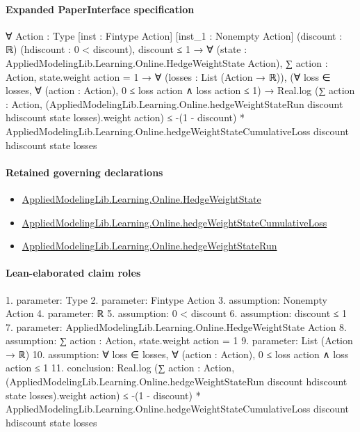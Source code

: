 \documentclass[10pt]{article}
\begin{document}
\paragraph{Expanded PaperInterface specification}
\begin{ReviewVerbatim}
∀ {Action : Type} [inst : Fintype Action] [inst_1 : Nonempty Action] (discount : ℝ) (hdiscount : 0 < discount),
  discount ≤ 1 →
    ∀ (state : AppliedModelingLib.Learning.Online.HedgeWeightState Action),
      ∑ action : Action, state.weight action = 1 →
        ∀ (losses : List (Action → ℝ)),
          (∀ loss ∈ losses, ∀ (action : Action), 0 ≤ loss action ∧ loss action ≤ 1) →
            Real.log
                (∑ action : Action,
                  (AppliedModelingLib.Learning.Online.hedgeWeightStateRun discount hdiscount state losses).weight
                    action) ≤
              -(1 - discount) *
                AppliedModelingLib.Learning.Online.hedgeWeightStateCumulativeLoss discount hdiscount state losses
\end{ReviewVerbatim}

\paragraph{Retained governing declarations}
\begin{itemize}\raggedright
\item \hyperlink{library-prerequisite-8196082d02788389}{Applied\allowbreak{}Modeling\allowbreak{}Lib.\allowbreak{}Learning.\allowbreak{}Online.\allowbreak{}Hedge\allowbreak{}Weight\allowbreak{}State}
\item \hyperlink{library-prerequisite-d910405064240e75}{Applied\allowbreak{}Modeling\allowbreak{}Lib.\allowbreak{}Learning.\allowbreak{}Online.\allowbreak{}hedge\allowbreak{}Weight\allowbreak{}State\allowbreak{}Cumulative\allowbreak{}Loss}
\item \hyperlink{library-prerequisite-ec888a887d36d73d}{Applied\allowbreak{}Modeling\allowbreak{}Lib.\allowbreak{}Learning.\allowbreak{}Online.\allowbreak{}hedge\allowbreak{}Weight\allowbreak{}State\allowbreak{}Run}
\end{itemize}
\paragraph{Lean-elaborated claim roles}\begin{ReviewVerbatim}
1. parameter: Type
2. parameter: Fintype Action
3. assumption: Nonempty Action
4. parameter: ℝ
5. assumption: 0 < discount
6. assumption: discount ≤ 1
7. parameter: AppliedModelingLib.Learning.Online.HedgeWeightState Action
8. assumption: ∑ action : Action, state.weight action = 1
9. parameter: List (Action → ℝ)
10. assumption: ∀ loss ∈ losses, ∀ (action : Action), 0 ≤ loss action ∧ loss action ≤ 1
11. conclusion: Real.log
    (∑ action : Action,
      (AppliedModelingLib.Learning.Online.hedgeWeightStateRun discount hdiscount state losses).weight action) ≤
  -(1 - discount) * AppliedModelingLib.Learning.Online.hedgeWeightStateCumulativeLoss discount hdiscount state losses
\end{ReviewVerbatim}
\end{document}
